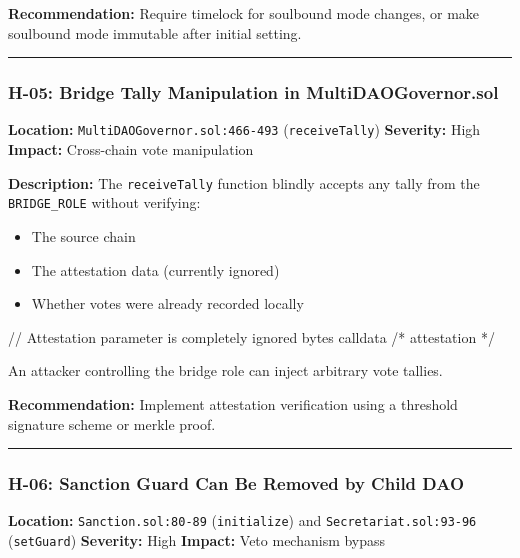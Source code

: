 \documentclass[
]{article}
\newenvironment{Shaded}{}{}
\newcommand{\NormalTok}[1]{#1}
\providecommand{\tightlist}{%
  \setlength{\itemsep}{0pt}\setlength{\parskip}{0pt}}
\begin{document}
\textbf{Recommendation:} Require timelock for soulbound mode changes, or
make soulbound mode immutable after initial setting.

\begin{center}\rule{0.5\linewidth}{0.5pt}\end{center}

\subsubsection{H-05: Bridge Tally Manipulation in
MultiDAOGovernor.sol}\label{h-05-bridge-tally-manipulation-in-multidaogovernorsol}

\textbf{Location:} \texttt{MultiDAOGovernor.sol:466-493}
(\texttt{receiveTally}) \textbf{Severity:} High \textbf{Impact:}
Cross-chain vote manipulation

\textbf{Description:} The \texttt{receiveTally} function blindly accepts
any tally from the \texttt{BRIDGE\_ROLE} without verifying:

\begin{itemize}
\tightlist
\item
  The source chain
\item
  The attestation data (currently ignored)
\item
  Whether votes were already recorded locally
\end{itemize}

\begin{Shaded}
\begin{Highlighting}[]
\NormalTok{// Attestation parameter is completely ignored}
\NormalTok{bytes calldata /* attestation */}
\end{Highlighting}
\end{Shaded}

An attacker controlling the bridge role can inject arbitrary vote
tallies.

\textbf{Recommendation:} Implement attestation verification using a
threshold signature scheme or merkle proof.

\begin{center}\rule{0.5\linewidth}{0.5pt}\end{center}

\subsubsection{H-06: Sanction Guard Can Be Removed by Child
DAO}\label{h-06-sanction-guard-can-be-removed-by-child-dao}

\textbf{Location:} \texttt{Sanction.sol:80-89} (\texttt{initialize}) and
\texttt{Secretariat.sol:93-96} (\texttt{setGuard}) \textbf{Severity:}
High \textbf{Impact:} Veto mechanism bypass
\end{document}
